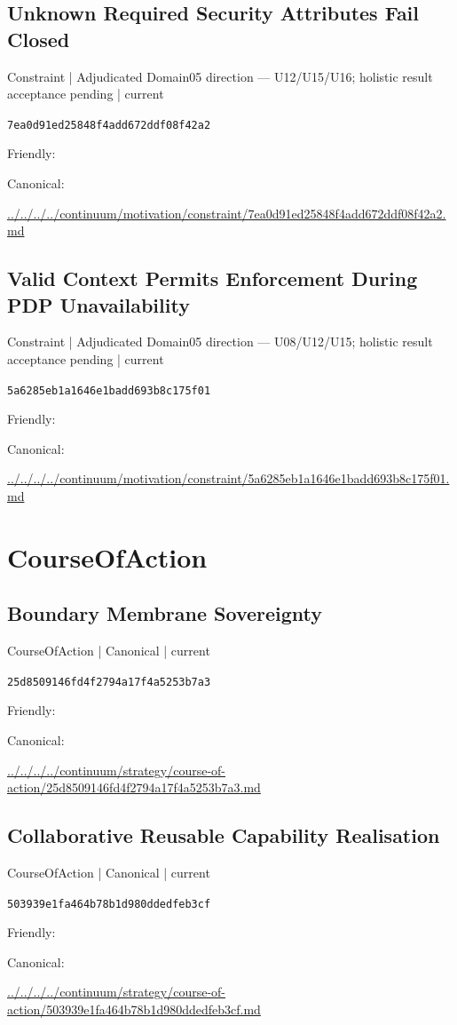 \documentclass[10pt,a4paper]{article}
\begin{document}
\subsection*{Unknown Required Security Attributes Fail Closed}
{\small Constraint | Adjudicated Domain05 direction — U12/U15/U16; holistic result acceptance pending | current}\par
\texttt{7ea0d91ed25848f4add672ddf08f42a2}\par
Friendly: \par
Canonical: \par
{\footnotesize\url{../../../../continuum/motivation/constraint/7ea0d91ed25848f4add672ddf08f42a2.md}}\par
\subsection*{Valid Context Permits Enforcement During PDP Unavailability}
{\small Constraint | Adjudicated Domain05 direction — U08/U12/U15; holistic result acceptance pending | current}\par
\texttt{5a6285eb1a1646e1badd693b8c175f01}\par
Friendly: \par
Canonical: \par
{\footnotesize\url{../../../../continuum/motivation/constraint/5a6285eb1a1646e1badd693b8c175f01.md}}\par
\section*{CourseOfAction}
\subsection*{Boundary Membrane Sovereignty}
{\small CourseOfAction | Canonical | current}\par
\texttt{25d8509146fd4f2794a17f4a5253b7a3}\par
Friendly: \par
Canonical: \par
{\footnotesize\url{../../../../continuum/strategy/course-of-action/25d8509146fd4f2794a17f4a5253b7a3.md}}\par
\subsection*{Collaborative Reusable Capability Realisation}
{\small CourseOfAction | Canonical | current}\par
\texttt{503939e1fa464b78b1d980ddedfeb3cf}\par
Friendly: \par
Canonical: \par
{\footnotesize\url{../../../../continuum/strategy/course-of-action/503939e1fa464b78b1d980ddedfeb3cf.md}}\par
\end{document}
